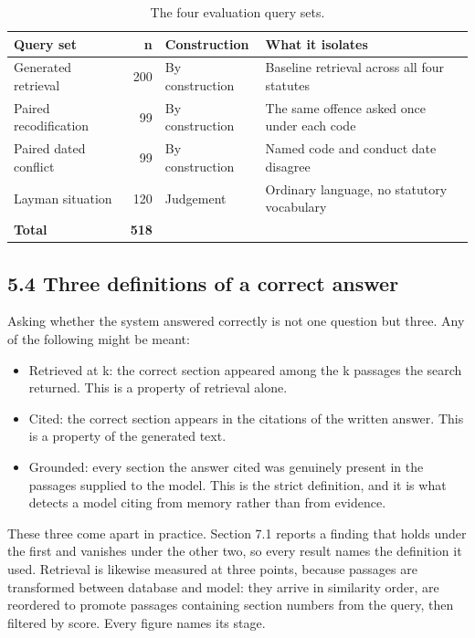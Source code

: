 \documentclass[12pt,a4paper]{article}
\begin{document}
\begin{table}[htbp]
\centering
\caption{The four evaluation query sets.}
\small
{}
\begin{tabular}{@{}p{}rp{}p{}@{}}
\toprule
\textbf{Query set} & \textbf{n} & \textbf{Construction} & \textbf{What it isolates} \\
\midrule
Generated retrieval & 200 & By construction & Baseline retrieval across all four statutes \\
Paired recodification & 99 & By construction & The same offence asked once under each code \\
Paired dated conflict & 99 & By construction & Named code and conduct date disagree \\
Layman situation & 120 & Judgement & Ordinary language, no statutory vocabulary \\
\midrule
\textbf{Total} & \textbf{518} &  &  \\
\bottomrule
\end{tabular}
\end{table}


\subsection*{5.4 Three definitions of a correct answer}
Asking whether the system answered correctly is not one question but three. Any of the following might be meant:

\begin{itemize}
  \item Retrieved at k: the correct section appeared among the k passages the search returned. This is a property of retrieval alone.
  \item Cited: the correct section appears in the citations of the written answer. This is a property of the generated text.
  \item Grounded: every section the answer cited was genuinely present in the passages supplied to the model. This is the strict definition, and it is what detects a model citing from memory rather than from evidence.
\end{itemize}

These three come apart in practice. Section 7.1 reports a finding that holds under the first and vanishes under the other two, so every result names the definition it used. Retrieval is likewise measured at three points, because passages are transformed between database and model: they arrive in similarity order, are reordered to promote passages containing section numbers from the query, then filtered by score. Every figure names its stage.
\end{document}
